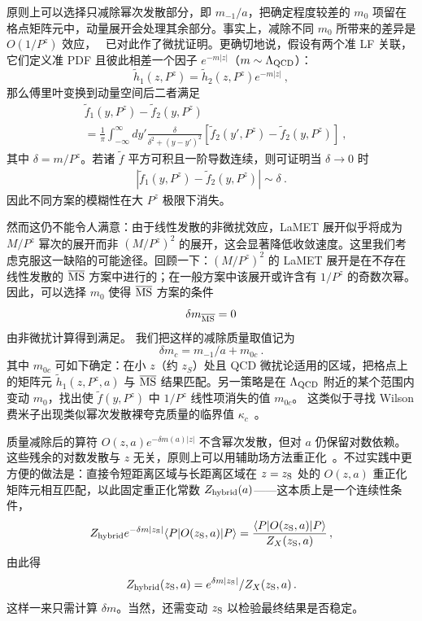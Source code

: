 原则上可以选择只减除幂次发散部分，即 $m_{-1}/a$，把确定程度较差的 $m_0$ 项留在格点矩阵元中，动量展开会处理其余部分。事实上，减除不同 $m_0$ 所带来的差异是 $O(1/P^z)$ 效应，~\cite{Xiong:2013bka} 已对此作了微扰证明。更确切地说，假设有两个准 LF 关联，它们定义准 PDF 且彼此相差一个因子 $e^{-m|z|}$（$m \sim \Lambda_{\rm QCD}$）：
\begin{equation}
\tilde h_1(z,P^z)=\tilde h_2(z,P^z)e^{-m|z|} \ ,
\end{equation}
那么傅里叶变换到动量空间后二者满足
\begin{align}
&\tilde f_1(y,P^z)-\tilde f_2(y,P^z)\nonumber \\
&=\frac{1}{\pi}\int_{-\infty}^{\infty} dy' \frac{\delta}{\delta^2+(y-y')^2} \left[\tilde f_2(y',P^z)-\tilde f_2(y,P^z) \right]\ ,
\end{align}
其中 $\delta=m/P^z$。若诸 $\tilde f$ 平方可积且一阶导数连续，则可证明当 $\delta \rightarrow 0$ 时
\begin{align}
|\tilde f_1(y,P^z)-\tilde f_2(y,P^z)|\sim \delta \ .
\end{align}
因此不同方案的模糊性在大 $P^z$ 极限下消失。

然而这仍不能令人满意：由于线性发散的非微扰效应，LaMET 展开似乎将成为 $M/P^z$ 幂次的展开而非 $(M/P^z)^2$ 的展开，这会显著降低收敛速度。这里我们考虑克服这一缺陷的可能途径。回顾一下：$(M/P^z)^2$ 的 LaMET 展开是在不存在线性发散的 ${\overline{\rm MS}}$ 方案中进行的；在一般方案中该展开或许含有 $1/P^z$ 的奇数次幂。因此，可以选择 $m_0$ 使得 $\overline{\rm MS}$ 方案的条件
\begin{equation}
      \delta m_{\overline{\rm MS}} = 0
\end{equation}
由非微扰计算得到满足。
我们把这样的减除质量取值记为
\begin{equation}
\delta m_c = m_{-1}/a + m_{0c}\ .
\end{equation}
其中 $m_{0c}$ 可如下确定：在小 $z$（约 $z_S$）处且 QCD 微扰论适用的区域，把格点上的矩阵元 $\tilde h_1(z, P^z, a)$ 与 $\overline{\rm MS}$ 结果匹配。另一策略是在 $\Lambda_{\rm QCD}$ 附近的某个范围内变动 $m_{0}$，找出使 $\tilde f(y, P^z)$ 中 $1/P^z$ 线性项消失的值 $m_{0c}$。
这类似于寻找 Wilson 费米子出现类似幂次发散裸夸克质量的临界值 $\kappa_c$~\cite{Lepage:1992xa}。

质量减除后的算符 $O(z,a)e^{-\delta m(a)|z|}$ 不含幂次发散，但对 $a$ 仍保留对数依赖。这些残余的对数发散与 $z$ 无关，原则上可以用辅助场方法重正化~\cite{Green:2017xeu,Green:2020xco}。不过实践中更方便的做法是：直接令短距离区域与长距离区域在 $z=z_{\rm S}$ 处的 $O(z,a)$ 重正化矩阵元相互匹配，以此固定重正化常数 $Z_{\rm hybrid}(a)$——这本质上是一个连续性条件，
\begin{align}
Z_{\rm hybrid} e^{-\delta m |z_{\rm S}|}\langle P| O(z_{\rm S},a) | P \rangle  = \frac{\langle P| O(z_{\rm S},a) | P \rangle }{Z_X(z_{\rm S},a) }\,,
\end{align}
由此得
\begin{align}
Z_{\rm hybrid}(z_{\rm S},a) = e^{\delta m |z_{\rm S}|}/{Z_X(z_{\rm S},a)  }\,.
\end{align}
这样一来只需计算 $\delta m$。当然，还需变动 $z_{\rm S}$ 以检验最终结果是否稳定。


